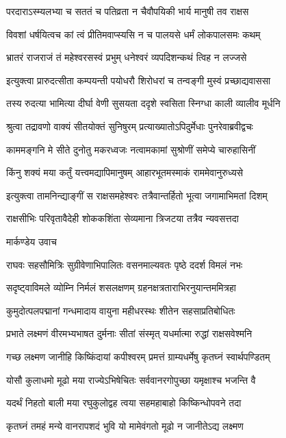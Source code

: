 \twolineshloka
{परदाराऽस्म्यलभ्या च सततं च पतिव्रता}
{न चैवौपयिकी भार्य मानुषी तव राक्षस}


\twolineshloka
{विवशां धर्षयित्वच कां त्वं प्रीतिमवाप्स्यसि}
{न च पालयसे धर्मं लोकपालसमः कथम्}


\twolineshloka
{भ्रातरं राजराजं तं महेश्वरसस्वं प्रभुम्}
{धनेश्वरं व्यपदिशन्कथं त्विह न लज्जसे}


\twolineshloka
{इत्युक्त्वा प्रारुदत्सीता कम्पयन्ती पयोधरौ}
{शिरोधरां च तन्वङ्गी मुस्वं प्रच्छाद्यवाससा}


\twolineshloka
{तस्य रुदत्या भामित्या दीर्घा वेणी सुसयता}
{ददृशे स्वसिता स्निग्धा काली व्यालीव मूर्धनि}


\twolineshloka
{श्रुत्वा तद्रावणो वाक्यं सीतयोक्तं सुनिषुरम्}
{प्रत्याख्यातोऽपिदुर्मेधाः पुनरेवाब्रवीद्वचः}


\twolineshloka
{काममङ्गनि मे सीते दुनोतु मकरध्वजः}
{नत्वामकामां सुश्रोणीं समेप्ये चारुहासिनीं}


\twolineshloka
{किंनु शक्यं मया कर्तुं यत्त्वमद्यापिमानुषम्}
{आहारभूतमस्माकं राममेवानुरुध्यसे}


\twolineshloka
{इत्युक्त्वा तामनिन्द्याङ्गीं स राक्षसमहेश्वरः}
{तत्रैवान्तर्हितो भूत्वा जगामाभिमतां दिशम्}


\twolineshloka
{राक्षसीभिः परिवृतावैदेही शोककशिंता}
{सेव्यमाना त्रिजटया तत्रैव न्यवसत्तदा}


\twolineshloka
{मार्कण्डेय उवाच}
{}


\twolineshloka
{राघवः सहसौमित्रिः सुग्रीवेणाभिपालितः}
{वसनमाल्यवतः पृष्ठे ददर्श विमलं नभः}


\twolineshloka
{सदृष्ट्वाविमले व्योम्नि निर्मलं शसलक्षणम्}
{ग्रहनक्षत्रताराभिरनुयान्तममित्रहा}


\twolineshloka
{कुमुदोत्पलपद्मानां गन्धमादाय वायुना}
{महीधरस्थः शीतेन सहसाप्रतिबोधितः}


\twolineshloka
{प्रभाते लक्ष्मणं वीरमभ्यभाषत दुर्मनाः}
{सीतां संस्मृत् यधर्मात्मा रुद्धां राक्षसवेश्मनि}


\twolineshloka
{गच्छ लक्ष्मण जानीहि किष्किंदायां कपीश्वरम्}
{प्रमत्तं ग्राम्यधर्मेषु कृतघ्नं स्वार्थपण्डितम्}


\twolineshloka
{योसौ कुलाधमो मूढो मया राज्येऽभिषेचितः}
{सर्ववानरगोपुच्छा यमृक्षाश्च भजन्ति वै}


\twolineshloka
{यदर्थं निहतो बाली मया रघुकुलोद्वह}
{त्वया सहमहाबाहो किष्किन्धोपवने तदा}


\twolineshloka
{कृतघ्नं तमहं मन्ये वानरापशदं भुवि}
{यो मामेवंगतो मूढो न जानीतेऽद्य लक्ष्मण}


